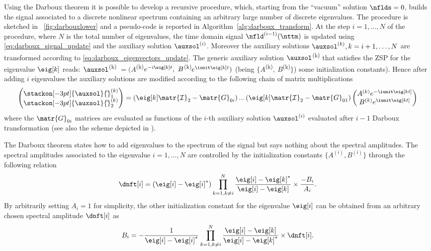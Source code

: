 Using the Darboux theorem it is possible to develop a recursive procedure, which, starting from the
``vacuum'' solution $\nflds = 0$, builds the signal associated to a discrete
nonlinear spectrum containing an arbitrary large number of discrete eigenvalues. The procedure is sketched in \figurename~\ref{fig:darbouxlower} and a pseudo-code is reported in Algorithm~\ref{alg:darboux_transform}.
At the step $i = 1,\dots, N$ of the procedure, where $N$ is the total number of eigenvalues, the time domain signal $\nfld^{(i-1)}(\nttm)$ is updated using \eqref{eq:darboux_signal_update} and the auxiliary solution $\auxsol^{(i)}$. Moreover the auxiliary solutions $\auxsol^{(k)}, k=i+1, \dots, N$ are transformed according to \eqref{eq:darboux_eigenvectors_update}.
The generic auxiliary solution $\auxsol$\textsuperscript{(k)} that satisfies
the \ac{ZSP} for the eigenvalue $\eig[k]$ reads:
$\auxsol$\textsuperscript{(k)}
$=(A$\textsuperscript{(k)}$e^{-i\eig[k]t},~B$\textsuperscript{(k)}$e^{
\iunit \eig[k]t})$ (being $\{A$\textsuperscript{(k)}$,~B$\textsuperscript{(k)}$\}$)
some initialization constants). Hence after adding $i$ eigenvalues the auxiliary
solutions are modified according to the following chain of matrix
multiplications
\stackMath
\begin{align}
\begin{pmatrix}
       \stackon[-3pt]{\auxsol}{\hat{}}_1^{(k)} \\
       \stackon[-3pt]{\auxsol}{\hat{}}_2^{(k)}
     \end{pmatrix}=
     \left(\eig[k]\mathcal{\matr{I}}_2-\matr{G}_{0i}\right)...\left(\eig[k]\mathcal{\matr{I}}_2-\matr{G}_{01}\right)
     \begin{pmatrix}
      A^{(k)} e^{-\iunit\eig[kt]} \\
       B^{(k)} e^{\iunit\eig[kt]}
     \end{pmatrix}
\end{align}
where the $\matr{G}_{0i}$ matrices are evaluated as functions of the $i$-th auxiliary
solution $\auxsol^{(i)}$ evaluated  after $i-1$ Darboux transformation (see also the scheme depicted in
).


The Darboux theorem states how to add eigenvalues to the spectrum of the signal
but says nothing about the spectral amplitudes. The spectral amplitudes associated to the eigenvalue $i=1,\dots,N$ are controlled by the initialization constants $\{A^{(i)},
B^{(i)}\}$ through the following relation \cite{Aref2016c}
\begin{equation}
  \dnft[i] = (\eig[i] - \eig[i]^*) \prod_{k=1,k\neq i}^{N}
  \dfrac{\eig[i] - \eig[k]^*}{\eig[i] - \eig[k]} \times \dfrac{-B_i}{A_i}.
\end{equation}
By arbitrarily setting $A_i = 1$ for simplicity,  the other initialization constant for the eigenvalue $\eig[i]$ can be obtained from an arbitrary chosen spectral amplitude $\dnft[i]$ as
\begin{equation}
  B_i = - \dfrac{1}{\eig[i] - \eig[i]^*} \prod_{k=1,k\neq i}^{N}
  \dfrac{\eig[i] - \eig[k]}{\eig[i] - \eig[k]^*} \times \dnft[i].
\end{equation}

